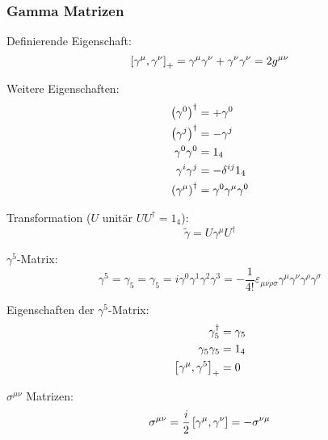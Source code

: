 \documentclass[11pt]{article}
\numberwithin{equation}{section}
\begin{document}
      \subsubsection{Gamma Matrizen}
        Definierende Eigenschaft:
        \begin{equation}
          \left[\gamma^\mu,\gamma^\nu\right]_{+} = \gamma^\mu \gamma^\nu + \gamma^\nu \gamma^\nu = 2g^{\mu\nu}
        \end{equation}

        Weitere Eigenschaften:
        \begin{equation}
          \begin{aligned}
            \Br{\gamma^0}^\dagger &= +\gamma^0 \\
            \Br{\gamma^j}^\dagger &= -\gamma^j \\
            \gamma^0 \gamma^0 &= 1_4 \\ %
            \gamma^i \gamma^j &= - \delta^{ij} 1_4 \\
            \Br{\gamma^\mu}^\dagger &= \gamma^0 \gamma^\mu \gamma^0 \\
          \end{aligned}
        \end{equation}

        Transformation ($U$ unitär $U U^\dagger=1_4$):
        \begin{equation}
          \tilde{\gamma} = U \gamma^\mu U^\dagger
        \end{equation}

        $\gamma^5$-Matrix:
        \begin{equation}
          \gamma^5 = \gamma_5 = \gamma_5 = i\gamma^0 \gamma^1 \gamma^2 \gamma^3 = -\frac{1}{4!}\varepsilon_{\mu\nu\rho\sigma} \gamma^\mu \gamma^\nu \gamma^\rho \gamma^\sigma
        \end{equation}

        Eigenschaften der $\gamma^5$-Matrix:
        \begin{equation}
          \begin{aligned}
            \gamma_5^\dagger &= \gamma_5 \\
            \gamma_5 \gamma_5 &= 1_4 \\
            \left[\gamma^\mu,\gamma^5\right]_{+} &= 0 \\
          \end{aligned}
        \end{equation}

        $\sigma^{\mu\nu}$ Matrizen:
        \begin{equation}
          \sigma^{\mu\nu} = \frac{i}{2}\left[\gamma^\mu,\gamma^\nu\right] = -\sigma^{\nu\mu}
        \end{equation}
\end{document}
